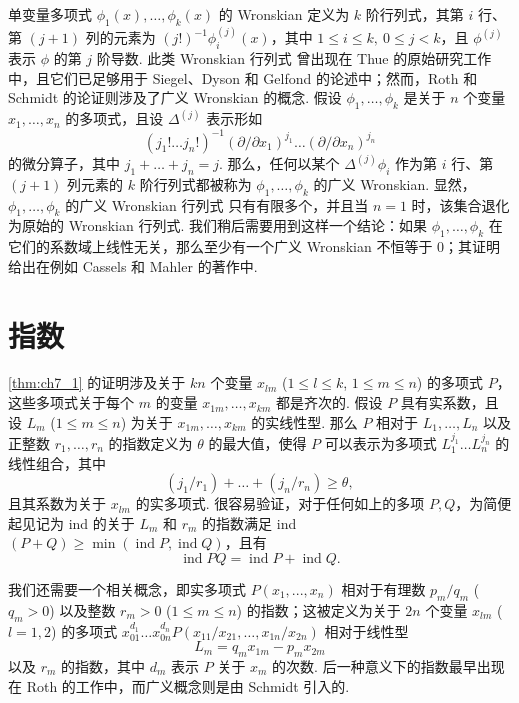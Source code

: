 单变量多项式 $\phi_1(x), \ldots, \phi_k(x)$ 的 Wronskian 定义为 $k$ 阶行列式，其第 $i$ 行、第 $(j+1)$ 列的元素为 $(j!)^{-1}\phi_i^{(j)}(x)$，其中 $1 \leq i \leq k, \ 0 \leq j < k$，且 $\phi^{(j)}$ 表示 $\phi$ 的第 $j$ 阶导数. 此类 Wronskian 行列式 曾出现在 Thue 的原始研究工作中，且它们已足够用于 Siegel、Dyson 和 Gelfond 的论述中；然而，Roth 和 Schmidt 的论证则涉及了广义 Wronskian 的概念. 假设 $\phi_1, \ldots, \phi_k$ 是关于 $n$ 个变量 $x_1, \ldots, x_n$ 的多项式，且设 $\Delta^{(j)}$ 表示形如
\[(j_1!\ldots j_n!)^{-1}(\partial/\partial x_1)^{j_1}\ldots(\partial/\partial x_n)^{j_n}\]
的微分算子，其中 $j_1 + \ldots + j_n = j$. 那么，任何以某个 $\Delta^{(j)}\phi_i$ 作为第 $i$ 行、第 $(j+1)$ 列元素的 $k$ 阶行列式都被称为 $\phi_1, \ldots, \phi_k$ 的广义 Wronskian. 显然，$\phi_1, \ldots, \phi_k$ 的广义 Wronskian 行列式 只有有限多个，并且当 $n=1$ 时，该集合退化为原始的 Wronskian 行列式. 我们稍后需要用到这样一个结论：如果 $\phi_1, \ldots, \phi_k$ 在它们的系数域上线性无关，那么至少有一个广义 Wronskian 不恒等于 0；其证明给出在例如 Cassels 和 Mahler 的著作中.

\section{指数}\label{sec:ch7_3}

\autoref{thm:ch7_1} 的证明涉及关于 $kn$ 个变量 $x_{lm}$ ($1 \le l \le k$, $1 \le m \le n$) 的多项式 $P$，这些多项式关于每个 $m$ 的变量 $x_{1m}, \ldots, x_{km}$ 都是齐次的. 假设 $P$ 具有实系数，且设 $L_m$ ($1 \le m \le n$) 为关于 $x_{1m}, \ldots, x_{km}$ 的实线性型. 那么 $P$ 相对于 $L_1, \ldots, L_n$ 以及正整数 $r_1, \dots, r_n$ 的指数定义为 $\theta$ 的最大值，使得 $P$ 可以表示为多项式 $L_1^{j_1} \ldots L_n^{j_n}$ 的线性组合，其中
\[(j_1/r_1) + \ldots + (j_n/r_n) \geq \theta,\]
且其系数为关于 $x_{lm}$ 的实多项式. 很容易验证，对于任何如上的多项 $P, Q$，为简便起见记为 ind 的关于 $L_m$ 和 $r_m$ 的指数满足 ind $(P+Q) \ge \min (\operatorname{ind} P, \operatorname{ind} Q)$，且有
\[\operatorname{ind} PQ = \operatorname{ind} P + \operatorname{ind} Q.\]

我们还需要一个相关概念，即实多项式 $P(x_1, ..., x_n)$ 相对于有理数 $p_m/q_m$ ($q_m > 0$) 以及整数 $r_m > 0$ ($1 \le m \le n$) 的指数；这被定义为关于 $2n$ 个变量 $x_{lm}$ ($l = 1, 2$) 的多项式 $x_{01}^{d_1} \dots x_{0n}^{d_n} P(x_{11}/x_{21}, \dots, x_{1n}/x_{2n})$ 相对于线性型
\[L_m = q_m x_{1m} - p_m x_{2m}\]
以及 $r_m$ 的指数，其中 $d_m$ 表示 $P$ 关于 $x_m$ 的次数. 后一种意义下的指数最早出现在 Roth 的工作中，而广义概念则是由 Schmidt 引入的.


